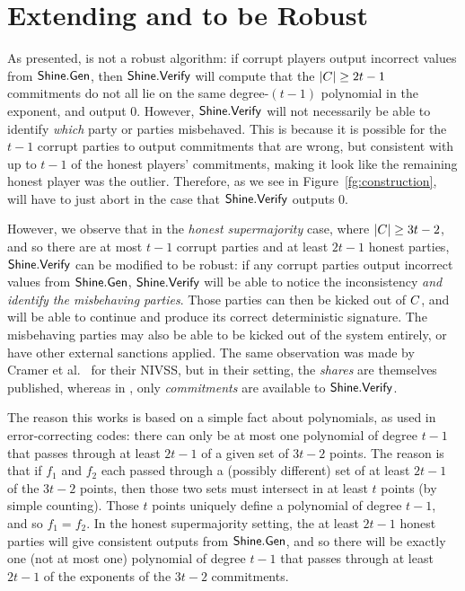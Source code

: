 \section{Extending \DVRFOne and \glitter to be Robust}
\label{robust-shine}

As presented, \DVRFOne is not a robust algorithm: if corrupt players
output incorrect values from $\mathsf{Shine}.\mathsf{Gen}$, then
$\mathsf{Shine}.\mathsf{Verify}$ will compute that the $|C| \ge 2t-1$
commitments do not all lie on the same degree-$(t-1)$ polynomial in the
exponent, and output 0.  However, $\mathsf{Shine}.\mathsf{Verify}$ will not
necessarily be able to identify \emph{which} party or parties
misbehaved.  This is because it is possible for the $t-1$ corrupt
parties to output commitments that are wrong, but consistent with up to
$t-1$ of the honest players' commitments, making it look like the
remaining honest player was the outlier.  Therefore, as we see in
Figure~\ref{fg:construction},
\glitter will have to just abort in the case that
$\mathsf{Shine}.\mathsf{Verify}$ outputs 0.

However, we observe that in the \emph{honest supermajority} case, where
$|C| \ge 3t-2$, and so there are at most $t-1$ corrupt parties
and at least $2t-1$ honest parties, $\mathsf{Shine}.\mathsf{Verify}$ can be modified
to be robust: if any corrupt parties output incorrect values from
$\mathsf{Shine}.\mathsf{Gen}$, $\mathsf{Shine}.\mathsf{Verify}$ will be able to notice the
inconsistency \emph{and identify the misbehaving parties}.  Those
parties can then be kicked out of $C$, and \glitter will be
able to continue and produce its correct deterministic signature.  The
misbehaving parties may also be able to be kicked out of the system
entirely, or have other external sanctions applied.
The same observation was made by Cramer et al.~\cite{CramerDI05} for their NIVSS, but in their setting, the \emph{shares} are themselves published, whereas in \DVRFOne, only \emph{commitments} are available to $\mathsf{Shine}.\mathsf{Verify}$.

The reason this works is based on a simple fact about polynomials, as
used in error-correcting codes: there can only be at most one polynomial
of degree $t-1$ that passes through at least $2t-1$ of a given set of
$3t-2$ points.  The reason is that if $f_1$ and $f_2$ each passed
through a (possibly different) set of at least $2t-1$ of the $3t-2$
points, then those two sets must intersect in at least $t$ points (by
simple counting).  Those $t$ points uniquely define a polynomial of
degree $t-1$, and so $f_1 = f_2$.  In the honest supermajority setting,
the at least $2t-1$ honest parties will give consistent outputs from
$\mathsf{Shine}.\mathsf{Gen}$, and so there will be exactly one (not at most
one) polynomial of degree $t-1$ that passes through at least $2t-1$ of
the exponents of the $3t-2$ commitments.

